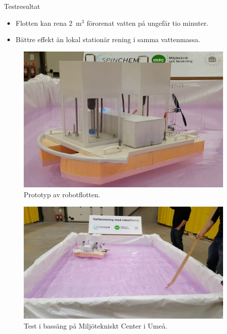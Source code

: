 \documentclass[final]{beamer}
\newlength{\onecolwid}
\begin{document}
\begin{frame}[t]
\begin{columns}[t, totalwidth=\textwidth]
\begin{column}{\onecolwid}
    \end{column}
    \begin{column}{\onecolwid}

      \begin{block}{Testresultat}
        \begin{itemize}
        \item Flotten kan rena 2~m$^3$ förorenat vatten på ungefär tio minuter.
        \item Bättre effekt än lokal stationär rening i samma vattenmassa.
        \end{itemize}

        \vskip 2cm
        \begin{figure}[H]
          \centering
          \includegraphics[width=\linewidth]{figures/flotte.png}
          \caption{Prototyp av robotflotten.}
        \end{figure}

        \vskip 2cm
        \begin{figure}[H]
          \centering
          \includegraphics[width=\linewidth]{figures/pool.jpeg}
          \caption{Test i bassäng på Miljötekniskt Center i Umeå.}
        \end{figure}
      \end{block}

    \end{column}

  \end{columns} %

\end{frame} %
\end{document}
